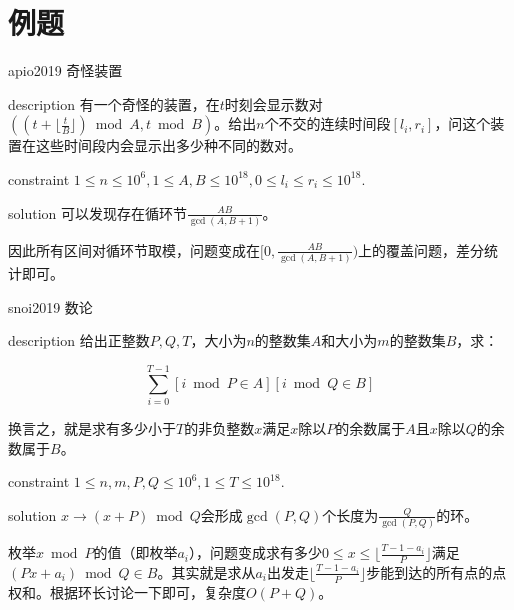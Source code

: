 \documentclass{beamer}
\begin{document}
\section{例题}
\begin{frame}{apio2019 奇怪装置}
	\begin{block}{description}
		有一个奇怪的装置，在$t$时刻会显示数对$((t+\lfloor\frac tB\rfloor) \bmod A, t \bmod B)$。给出$n$个不交的连续时间段$[l_i,r_i]$，问这个装置在这些时间段内会显示出多少种不同的数对。
	\end{block}
	\begin{block}{constraint}
		$1 \le n \le 10^6, 1 \le A, B \le 10^{18}, 0 \le l_i \le r_i \le 10^{18}.$
	\end{block}
	\pause
	\begin{block}{solution}
		可以发现存在循环节$\frac{AB}{\gcd(A,B+1)}$。
		
		因此所有区间对循环节取模，问题变成在$[0,\frac{AB}{\gcd(A,B+1)})$上的覆盖问题，差分统计即可。
	\end{block}
\end{frame}
\begin{frame}{snoi2019 数论}
	\begin{block}{description}
		给出正整数$P,Q,T$，大小为$n$的整数集$A$和大小为$m$的整数集$B$，求：
		
		$$\sum_{i=0}^{T-1}[i \bmod P \in A][i \bmod Q \in B]$$
		
		换言之，就是求有多少小于$T$的非负整数$x$满足$x$除以$P$的余数属于$A$且$x$除以$Q$的余数属于$B$。
	\end{block}
	\begin{block}{constraint}
		$1 \le n, m, P, Q \le 10^6, 1 \le T \le 10^{18}.$
	\end{block}
	\pause
	\begin{block}{solution}
		$x\to (x+P) \bmod Q$会形成$\gcd(P,Q)$个长度为$\frac{Q}{\gcd(P,Q)}$的环。
		
		枚举$x\bmod P$的值（即枚举$a_i$），问题变成求有多少$0\le x\le \lfloor\frac{T-1-a_i}{P}\rfloor$满足$(Px+a_i)\bmod Q\in B$。其实就是求从$a_i$出发走$\lfloor\frac{T-1-a_i}{P}\rfloor$步能到达的所有点的点权和。根据环长讨论一下即可，复杂度$O(P+Q)$。
	\end{block}
\end{frame}
\end{document}
